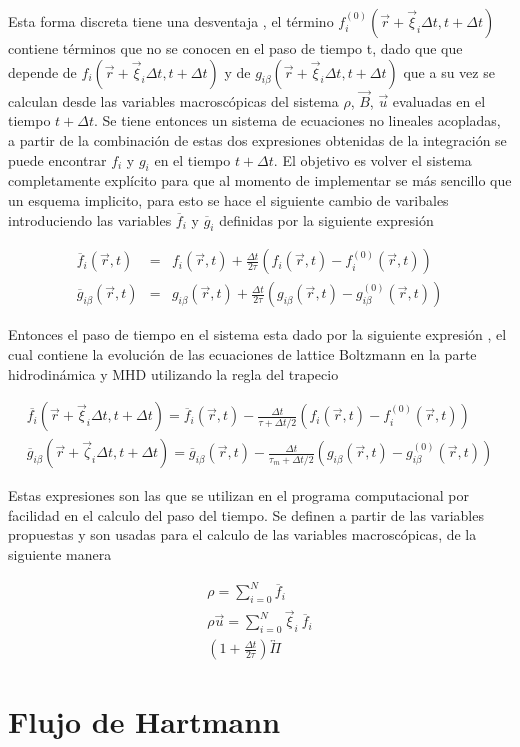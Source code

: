 \noindent Esta forma discreta tiene una desventaja , el término $f_{i}^{(0)}(\vec{r}+\vec{\xi}_{i}\Delta t,t+\Delta t)$ contiene términos que no se conocen en el paso de tiempo t, dado que que depende de $f_{i}(\vec{r}+\vec{\xi}_{i}\Delta t,t+\Delta t)$ y de $g_{i\beta}(\vec{r}+\vec{\xi}_{i}\Delta t,t+\Delta t)$ que a su vez se calculan desde las variables macroscópicas del sistema $\rho$, $\vec{B}$, $\vec{u}$ evaluadas en el tiempo $t+\Delta t$. Se tiene entonces un sistema de ecuaciones no lineales acopladas, a partir de la combinación de estas dos expresiones obtenidas de la integración se puede encontrar $f_{i}$ y $g_{i}$ en el tiempo $t+\Delta t$. El objetivo es volver el sistema completamente explícito para que al momento de implementar se más sencillo que un esquema implicito, para esto se hace el siguiente cambio de varibales introduciendo las variables $\overline{f}_{i}$ y $\overline{g}_{i}$ definidas por la siguiente expresión 

\begin{eqnarray}
    \overline{f}_{i}(\vec{r},t) &=& f_{i}(\vec{r},t) + \frac{\Delta t}{2\tau}\left(f_{i}(\vec{r},t)-f_{i}^{(0)}(\vec{r},t)\right) \\
    \overline{g}_{i\beta}(\vec{r},t) &=& g_{i\beta}(\vec{r},t) + \frac{\Delta t}{2\tau}\left(g_{i\beta}(\vec{r},t)-g_{i\beta}^{(0)}(\vec{r},t)\right)
\end{eqnarray}


Entonces el paso de tiempo en el sistema esta dado por la siguiente expresión , el cual contiene la evolución de las ecuaciones de lattice Boltzmann en la parte hidrodinámica y MHD utilizando la regla del trapecio

\begin{eqnarray}
    \overline{f_{i}}(\vec{r}+\vec{\xi}_{i}\Delta t,t+\Delta t) = \overline{f}_{i}(\vec{r},t) - \frac{\Delta t}{\tau+\Delta t/2}\left(f_{i}(\vec{r},t)-f_{i}^{(0)}(\vec{r},t)\right)\\
    \overline{g}_{i\beta}(\vec{r}+\vec{\zeta}_{i}\Delta t,t+\Delta t) = \overline{g}_{i\beta}(\vec{r},t) - \frac{\Delta t}{\tau_{m}+\Delta t/2}\left(g_{i\beta}(\vec{r},t)-g_{i\beta}^{(0)}(\vec{r},t)\right)
\end{eqnarray}

Estas expresiones son las que se utilizan en el programa computacional por facilidad en el calculo del paso del tiempo. Se definen a partir de las variables propuestas y son usadas para el calculo de las variables macroscópicas, de la siguiente manera

\begin{eqnarray}
    \rho = \sum_{i=0}^{N}\overline{f}_{i}\\
    \rho\vec{u}=\sum_{i=0}^{N}\vec{\xi}_{i}\ \overline{f}_{i}\\
    \left(1+\frac{\Delta t}{2\tau}\right)\overleftrightarrow{\Pi}
\end{eqnarray}


\noindent 

\section{Flujo de Hartmann}
